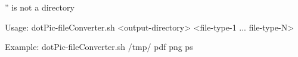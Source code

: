 '' is not a directory

Usage: dotPic-fileConverter.sh <output-directory> <file-type-1 ... file-type-N>

Example: dotPic-fileConverter.sh /tmp/ pdf png ps
